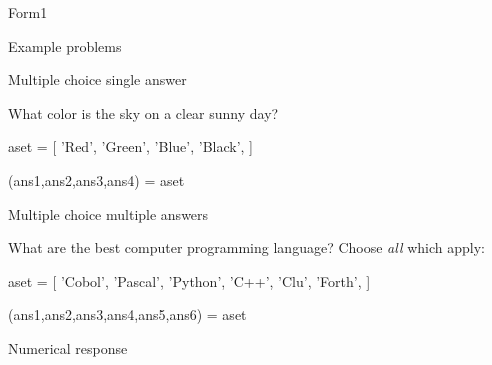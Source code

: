 \begin{edXchapter}{Form1}
\begin{edXsection}{Example problems}
\begin{edXvertical}
\end{edXvertical}


\begin{edXvertical}


\begin{edXproblem}{Multiple choice single answer}{}

What color is the sky on a clear sunny day?

\begin{edXscript}

aset = [ 'Red',
         'Green',
         'Blue',
         'Black',
      ]

(ans1,ans2,ans3,ans4) = aset

\end{edXscript}


\end{edXproblem}


\begin{edXproblem}{Multiple choice multiple answers}{}

What are the best computer programming language?  Choose {\em all} which apply:

\begin{edXscript}

aset = [ 'Cobol',
         'Pascal',
         'Python',
         'C++',
         'Clu',
         'Forth',
      ]

(ans1,ans2,ans3,ans4,ans5,ans6) = aset

\end{edXscript}


\end{edXproblem}

\end{edXvertical}


\begin{edXvertical}


\begin{edXproblem}{Numerical response}


\end{edXproblem}
\end{edXvertical}
\end{edXsection}
\end{edXchapter}
